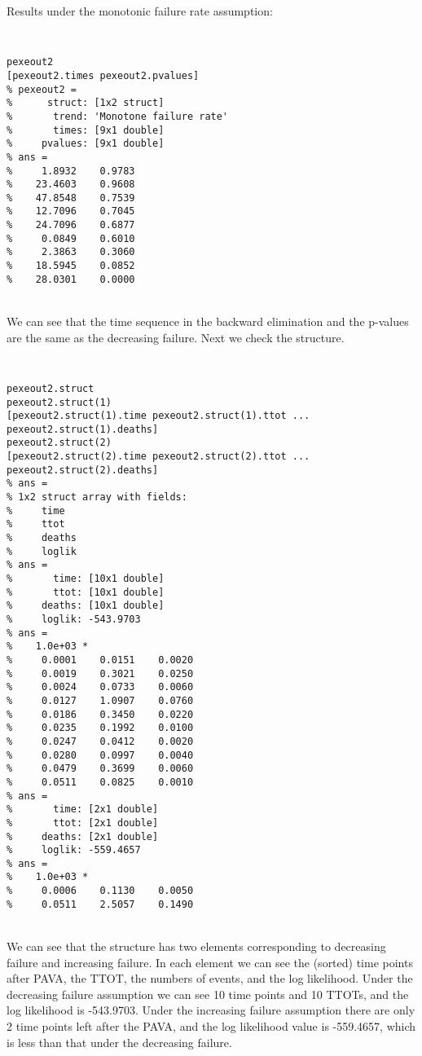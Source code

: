 \documentclass[12pt] {article}
\newenvironment{boxit}{\begin{lrbox}{\savepar}
\begin{minipage}[b]{5.5in}}
{\end{minipage}\end{lrbox}\fbox{\usebox{\savepar}}}
\begin{document}
Results under the monotonic failure rate assumption:

\begin{boxit} {\tt
\noindent
\begin{verbatim}
pexeout2
[pexeout2.times pexeout2.pvalues]
% pexeout2 =
%      struct: [1x2 struct]
%       trend: 'Monotone failure rate'
%       times: [9x1 double]
%     pvalues: [9x1 double]
% ans =
%     1.8932    0.9783
%    23.4603    0.9608
%    47.8548    0.7539
%    12.7096    0.7045
%    24.7096    0.6877
%     0.0849    0.6010
%     2.3863    0.3060
%    18.5945    0.0852
%    28.0301    0.0000
\end{verbatim}}
\end{boxit} \\
We can see that the time sequence in the backward elimination and the
p-values are the same as the decreasing failure. Next we check the structure.

\begin{boxit} {\tt
\noindent
\begin{verbatim}
pexeout2.struct
pexeout2.struct(1)
[pexeout2.struct(1).time pexeout2.struct(1).ttot ...
pexeout2.struct(1).deaths]
pexeout2.struct(2)
[pexeout2.struct(2).time pexeout2.struct(2).ttot ...
pexeout2.struct(2).deaths]
% ans =
% 1x2 struct array with fields:
%     time
%     ttot
%     deaths
%     loglik
% ans =
%       time: [10x1 double]
%       ttot: [10x1 double]
%     deaths: [10x1 double]
%     loglik: -543.9703
% ans =
%    1.0e+03 *
%     0.0001    0.0151    0.0020
%     0.0019    0.3021    0.0250
%     0.0024    0.0733    0.0060
%     0.0127    1.0907    0.0760
%     0.0186    0.3450    0.0220
%     0.0235    0.1992    0.0100
%     0.0247    0.0412    0.0020
%     0.0280    0.0997    0.0040
%     0.0479    0.3699    0.0060
%     0.0511    0.0825    0.0010
% ans =
%       time: [2x1 double]
%       ttot: [2x1 double]
%     deaths: [2x1 double]
%     loglik: -559.4657
% ans =
%    1.0e+03 *
%     0.0006    0.1130    0.0050
%     0.0511    2.5057    0.1490
\end{verbatim}}
\end{boxit} \\
We can see that the structure has two elements corresponding to
decreasing failure and increasing failure. In each element we can see the (sorted) time points after PAVA, the TTOT, the numbers of events, and the log likelihood. Under the decreasing failure assumption we can see 10 time points and 10 TTOTs, and the log likelihood is -543.9703. Under the increasing failure assumption there are only 2 time points left after the PAVA, and the log likelihood value is -559.4657, which is less than that under the decreasing failure.
\end{document}
